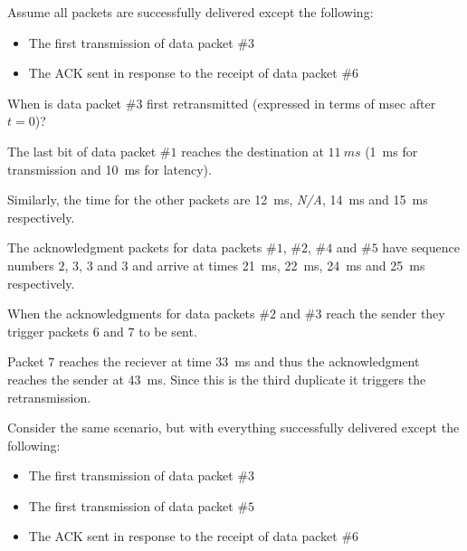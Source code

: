 \documentclass{supervision}
\begin{document}
\begin{questions}
\begin{parts}
          \begin{subparts}
            \subpart Assume all packets are successfully delivered except the
              following:
              \begin{itemize}
                \item The first transmission of data packet $\#3$
                \item The ACK sent in response to the receipt of data packet
                  $\#6$
              \end{itemize}
              When is data packet $\#3$ first retransmitted (expressed in terms
              of msec after $t=0$)?
              \begin{solution}
                The last bit of data packet $\#1$ reaches the destination at
                $\SI{11}{ms}$ (\SI{1}{ms} for transmission and \SI{10}{ms} for
                latency).

                Similarly, the time for the other packets are \SI{12}{ms},
                \emph{N/A}, \SI{14}{ms} and \SI{15}{ms} respectively.

                The acknowledgment packets for data packets $\#1$, $\#2$, $\#4$
                and $\#5$ have sequence numbers $2$, $3$, $3$ and $3$ and
                arrive at times \SI{21}{ms}, \SI{22}{ms}, \SI{24}{ms} and
                \SI{25}{ms} respectively.

                When the acknowledgments for data packets $\#2$ and $\#3$
                reach the sender they trigger packets $6$ and $7$ to be sent.

                Packet $7$ reaches the reciever at time \SI{33}{ms} and thus
                the acknowledgment reaches the sender at \SI{43}{ms}. Since
                this is the third duplicate it triggers the retransmission.
              \end{solution}

            \subpart Consider the same scenario, but with everything
              successfully delivered except the following:
              \begin{itemize}
                \item The first transmission of data packet $\#3$
                \item The first transmission of data packet $\#5$
                \item The ACK sent in response to the receipt of data packet
                  $\#6$
              \end{itemize}


\end{subparts}
\end{parts}
\end{questions}
\end{document}
